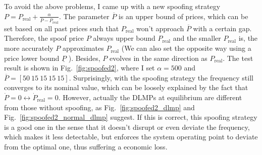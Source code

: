 \documentclass[journal,12pt,onecolumn,draftclsnofoot]{IEEEtran}
\begin{document}
To avoid the above problems, I came up with a new spoofing strategy $P=P_{\text{real}}+\frac{\alpha}{\overline{P} - P_{\text{real}}}$. The parameter $\overline{P}$ is an upper bound of prices, which can be set based on all past prices such that $P_{\text{real}}$ won't approach $\overline{P}$ with a certain gap. Therefore, the spoof price $P$ always upper bound $P_{\text{real}}$ and the smaller $P_{\text{real}}$ is, the more accurately $P$ approximates $P_{\text{real}}$ (We can also set the opposite way using a price lower bound $\underline{P}$ ). Besides, $P$ evolves in the same direction as $P_{\text{real}}$. The test result is shown in Fig.~\ref{fig:spoofed2}, where I set $\alpha=500$ and $\overline{P}=[50\ 15\ 15\ 15\ 15]$. Surprisingly, with the spoofing strategy the frequency still converges to its nominal value, which can be loosely explained by the fact that $\dot P = 0 \leftrightarrow \dot P_{\text{real}} = 0 $. However, actually the DLMPs at equilibrium are different from those without spoofing, as Fig.~\ref{fig:spoofed2_dlmp} and Fig.~\ref{fig:spoofed2_normal_dlmp} suggest. If this is correct, this spoofing strategy is a good one in the sense that it doesn't disrupt or even deviate the frequency, which makes it less detectable, but enforces the system operating point to deviate from the optimal one, thus suffering a economic loss.
\end{document}
